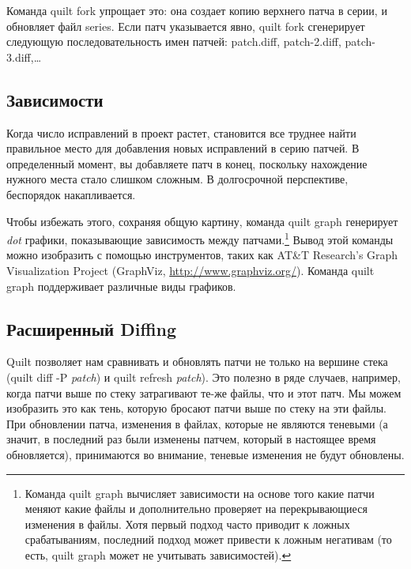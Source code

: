 \documentclass{article}
\newcommand{\quilt}[1]{\textsf{quilt #1}}
\begin{document}
Команда \quilt{fork} упрощает это: она создает копию верхнего патча в серии, и обновляет файл \textsf{series}. Если патч указывается явно, \quilt{fork} сгенерирует следующую последовательность имен патчей: \textsf{patch.diff}, \textsf{patch-2.diff}, \textsf{patch-3.diff},\dots

\subsection{Зависимости}
\label{sec:dependencies}

Когда число исправлений в проект растет, становится все труднее найти правильное место для добавления новых исправлений в серию патчей. В определенный момент, вы добавляете патч в конец, поскольку нахождение нужного места стало слишком сложным. В долгосрочной перспективе, беспорядок накапливается.

Чтобы избежать этого, сохраняя общую картину, команда \quilt{graph} генерирует \textit{dot} графики, показывающие зависимость между патчами.\footnote{Команда \quilt{graph} вычисляет зависимости на основе того какие патчи меняют какие файлы и дополнительно проверяет на перекрывающиеся изменения в файлы. Хотя первый подход часто приводит к ложных срабатываниям, последний подход может привести к ложным негативам (то есть, \quilt{graph} может не учитывать зависимостей). } Вывод этой команды можно изобразить с помощью инструментов, таких как AT\&T
Research's Graph Visualization Project (GraphViz,
\url{http://www.graphviz.org/}). Команда \quilt{graph} поддерживает различные виды графиков.

\subsection{Расширенный Diffing}

Quilt позволяет нам сравнивать и обновлять патчи не только на вершине стека (\quilt{diff -P \textit{patch}}) и \quilt{refresh \textit{patch}}).
Это полезно в ряде случаев, например, когда
%
%
%
%
%
патчи выше по стеку затрагивают те-же файлы, что и этот патч. Мы можем изобразить это как тень, которую бросают патчи выше по стеку на эти файлы. При обновлении патча, изменения в файлах, которые не являются теневыми (а значит, в последний раз были изменены патчем, который в настоящее время обновляется), принимаются во внимание, теневые изменения не будут обновлены.
\end{document}
